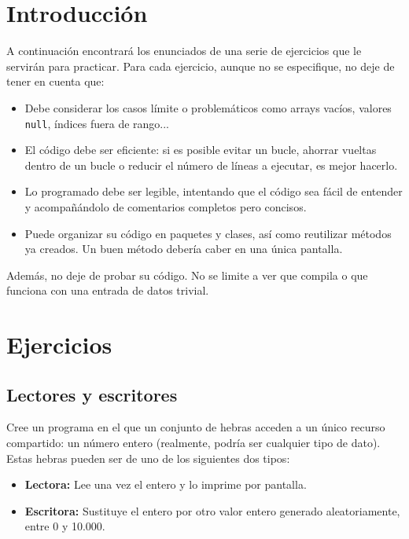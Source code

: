 \documentclass[a4paper]{article}
\newcommand{\code}[1]{\texttt{#1}}
\begin{document}


\section{Introducción}

A continuación encontrará los enunciados de una serie de ejercicios que le servirán para practicar. Para cada ejercicio, aunque no se especifique, no deje de tener en cuenta que:

\begin{itemize}
    \item Debe considerar los casos límite o problemáticos como arrays vacíos, valores \code{null}, índices fuera de rango...
    \item El código debe ser eficiente: si es posible evitar un bucle, ahorrar vueltas dentro de un bucle o reducir el número de líneas a ejecutar, es mejor hacerlo.
    \item Lo programado debe ser legible, intentando que el código sea fácil de entender y acompañándolo de comentarios completos pero concisos.
    \item Puede organizar su código en paquetes y clases, así como reutilizar métodos ya creados. Un buen método debería caber en una única pantalla.
\end{itemize}

Además, no deje de probar su código. No se limite a ver que compila o que funciona con una entrada de datos trivial.

\section{Ejercicios}

\subsection{Lectores y escritores}

Cree un programa en el que un conjunto de hebras acceden a un único recurso compartido: un número entero (realmente, podría ser cualquier tipo de dato). Estas hebras pueden ser de uno de los siguientes dos tipos:

\begin{itemize}
    \item \textbf{Lectora:} Lee una vez el entero y lo imprime por pantalla.
    \item \textbf{Escritora:} Sustituye el entero por otro valor entero generado aleatoriamente, entre 0 y 10.000.
\end{itemize}
\end{document}
